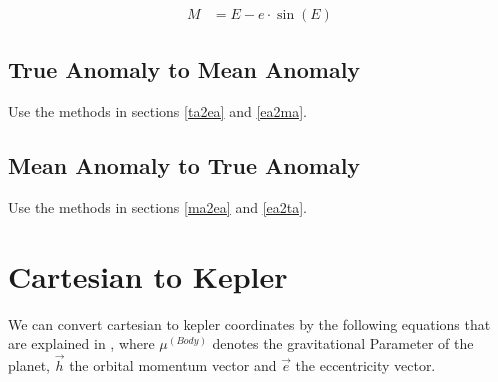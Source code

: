 \documentclass[11pt]{report}
\newcommand{\oa}[1]{\overrightarrow{#1}}
\begin{document}
\begin{align}
M & = E - e\cdot \sin(E)
\end{align}

\subsection{True Anomaly to Mean Anomaly}

Use the methods in sections \ref{ta2ea} and \ref{ea2ma}.

\subsection{Mean Anomaly to True Anomaly}

Use the methods in sections \ref{ma2ea} and \ref{ea2ta}.

\section{Cartesian to Kepler}

We can convert cartesian to kepler coordinates by the following
equations that are explained in \cite{RSCK}, where $\mu^{(Body)}$
denotes the gravitational Parameter of the planet, $\oa{h}$ the
 orbital momentum vector and $\oa{e}$ the
eccentricity vector.
\end{document}
